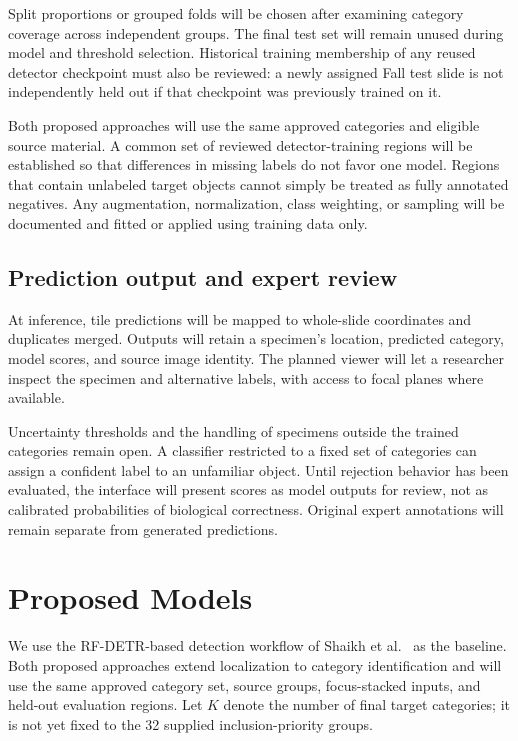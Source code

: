 \documentclass[conference,letterpaper]{IEEEtran}
\begin{document}
Split proportions or grouped folds will be chosen after examining category coverage across independent groups. The final test set will remain unused during model and threshold selection. Historical training membership of any reused detector checkpoint must also be reviewed: a newly assigned Fall test slide is not independently held out if that checkpoint was previously trained on it.

Both proposed approaches will use the same approved categories and eligible source material. A common set of reviewed detector-training regions will be established so that differences in missing labels do not favor one model. Regions that contain unlabeled target objects cannot simply be treated as fully annotated negatives. Any augmentation, normalization, class weighting, or sampling will be documented and fitted or applied using training data only.

\subsection{Prediction output and expert review}
At inference, tile predictions will be mapped to whole-slide coordinates and duplicates merged. Outputs will retain a specimen's location, predicted category, model scores, and source image identity. The planned viewer will let a researcher inspect the specimen and alternative labels, with access to focal planes where available.

Uncertainty thresholds and the handling of specimens outside the trained categories remain open. A classifier restricted to a fixed set of categories can assign a confident label to an unfamiliar object. Until rejection behavior has been evaluated, the interface will present scores as model outputs for review, not as calibrated probabilities of biological correctness. Original expert annotations will remain separate from generated predictions.

\section{Proposed Models}
We use the RF-DETR-based detection workflow of Shaikh et al.\ \cite{shaikh2026} as the baseline. Both proposed approaches extend localization to category identification and will use the same approved category set, source groups, focus-stacked inputs, and held-out evaluation regions. Let $K$ denote the number of final target categories; it is not yet fixed to the 32 supplied inclusion-priority groups.
\end{document}
